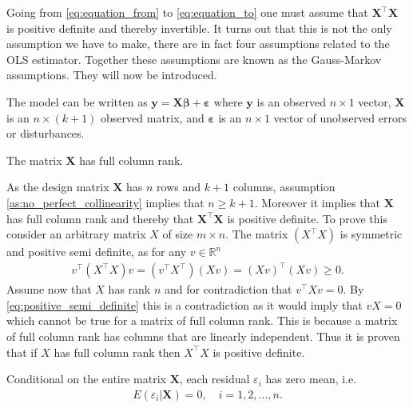 Going from \eqref{eq:equation_from} to \eqref{eq:equation_to} one must assume that $\mathbf{X}^\top\mathbf{X}$ is positive definite and thereby invertible.
It turns out that this is not the only assumption we have to make, there are in fact four assumptions related to the OLS estimator.
Together these assumptions are known as the Gauss-Markov assumptions. 
They will now be introduced.
\begin{assumption}\label{as:linear_in_the_parameters}
    The model can be written as $\mathbf{y} = \mathbf{X}\boldsymbol{\beta} + \boldsymbol{\varepsilon}$ where $\mathbf{y}$ is an observed $n \times 1$ vector, $\mathbf{X}$ is an $n \times (k + 1)$ observed matrix, and $\boldsymbol{\varepsilon}$ is an $n \times 1$ vector of unobserved errors or disturbances.
\end{assumption}
\begin{assumption}\label{as:no_perfect_collinearity}
    The matrix $\mathbf{X}$ has full column rank.
\end{assumption}
As the design matrix $\mathbf{X}$ has $n$ rows and $k + 1$ columns, assumption \ref{as:no_perfect_collinearity} implies that $n \geq k + 1$.
Moreover it implies that $\mathbf{X}$ has full column rank and thereby that $\mathbf{X}^\top\mathbf{X}$ is positive definite.
To prove this consider an arbitrary matrix $X$ of size $m \times n$.
The matrix $(X^\top X)$ is symmetric and positive semi definite, as for any $v \in \mathbb{R}^n$
\begin{align}\label{eq:positive_semi_definite}
v^\top (X^\top X) v = (v^\top X^\top) (X v) = (X v)^\top (X v) \geq 0.
\end{align}
Assume now that $X$ has rank $n$ and for contradiction that $v^\top X v = 0$.
By \eqref{eq:positive_semi_definite} this is a contradiction as it would imply that $vX = 0$ which cannot be true for a matrix of full column rank.
This is because a matrix of full column rank has columns that are linearly independent.
Thus it is proven that if $X$ has full column rank then $X^\top X$ is positive definite.
\begin{assumption}\label{as:zero_conditional_mean}
    Conditional on the entire matrix $\mathbf{X}$, each residual $\varepsilon_i$ has zero mean, i.e. \cite[p. 810]{Wooldridge2012}
    \begin{align*}
        E(\varepsilon_i | \mathbf{X}) = 0, \quad i = 1, 2, \ldots, n.
    \end{align*}
\end{assumption}
